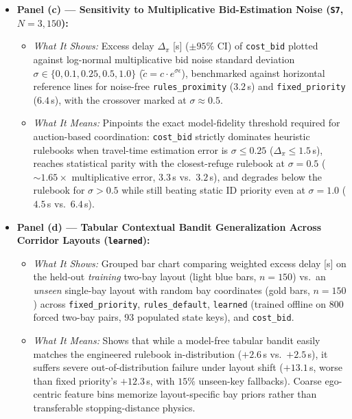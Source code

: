 \documentclass[10pt,a4paper]{article}
\begin{document}
{\begin{itemize}
\begin{itemize}
  \end{itemize}
  \item \textbf{Panel (c) --- Sensitivity to Multiplicative Bid-Estimation Noise (\texttt{S7}, $N=3{,}150$):}
  \begin{itemize}
    \item \emph{What It Shows:} Excess delay $\Delta_\pi$ [s] ($\pm 95\%$ CI) of \texttt{cost\_bid} plotted against log-normal multiplicative bid noise standard deviation $\sigma\in\{0, 0.1, 0.25, 0.5, 1.0\}$ ($\tilde{c}=c\cdot e^{\sigma\epsilon}$), benchmarked against horizontal reference lines for noise-free \texttt{rules\_proximity} ($3.2$\,s) and \texttt{fixed\_priority} ($6.4$\,s), with the crossover marked at $\sigma\approx 0.5$.
    \item \emph{What It Means:} Pinpoints the exact model-fidelity threshold required for auction-based coordination: \texttt{cost\_bid} strictly dominates heuristic rulebooks when travel-time estimation error is $\sigma\le 0.25$ ($\Delta_\pi \le 1.5$\,s), reaches statistical parity with the closest-refuge rulebook at $\sigma=0.5$ ($\sim 1.65\times$ multiplicative error, $3.3$\,s vs.\ $3.2$\,s), and degrades below the rulebook for $\sigma > 0.5$ while still beating static ID priority even at $\sigma=1.0$ ($4.5$\,s vs.\ $6.4$\,s).
  \end{itemize}
  \item \textbf{Panel (d) --- Tabular Contextual Bandit Generalization Across Corridor Layouts (\texttt{learned}):}
  \begin{itemize}
    \item \emph{What It Shows:} Grouped bar chart comparing weighted excess delay [s] on the held-out \emph{training} two-bay layout (light blue bars, $n=150$) vs.\ an \emph{unseen} single-bay layout with random bay coordinates (gold bars, $n=150$) across \texttt{fixed\_priority}, \texttt{rules\_default}, \texttt{learned} (trained offline on 800 forced two-bay pairs, 93 populated state keys), and \texttt{cost\_bid}.
    \item \emph{What It Means:} Shows that while a model-free tabular bandit easily matches the engineered rulebook in-distribution ($+2.6$\,s vs.\ $+2.5$\,s), it suffers severe out-of-distribution failure under layout shift ($+13.1$\,s, worse than fixed priority's $+12.3$\,s, with $15\%$ unseen-key fallbacks). Coarse ego-centric feature bins memorize layout-specific bay priors rather than transferable stopping-distance physics.
  \end{itemize}
\end{itemize}
}
\end{document}
